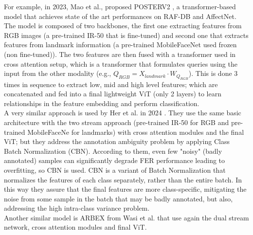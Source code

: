 For example, in 2023, Mao et al., proposed POSTERV2 \cite{RW_1_POSTERV2}, a transformer-based model that achieves state of the art performances on RAF-DB and AffectNet. The model is composed of two backbones, the first one extracting features from RGB images (a pre-trained IR-50 \cite{IR-50} that is fine-tuned) and second one that extracts features from landmark information (a pre-trained MobileFaceNet \cite{MobileFaceNet} used frozen (non fine-tuned)). The two features are then fused with a transformer used in cross attention setup, which is a transformer that formulates queries using the input from the other modality (e.g., $Q_{RGB}= X_{landmark} \cdot W_{Q_{RGB}} $). This is done 3 times in sequence to extract low, mid and high level features; which are concatenated and fed into a final lightweight ViT \cite{Vision_Transformer} (only 2 layers) to learn relationships in the feature embedding and perform classification.\\

A very similar approach is used by Her et al. in 2024 \cite{RW_13_BTN}. They use the same basic architecture with the two stream approach (pre-trained IR-50 for RGB  and pre-trained MobileFaceNe for landmarks) with cross attention modules and the final ViT; but they address the annotation ambiguity problem by applying Class Batch Normalization (CBN). According to them, even few "noisy" (badly annotated) samples can significantly degrade FER performance \cite{RW_13_BTN} leading to overfitting, so CBN is used. CBN is a variant of Batch Normalization that normalizes the features of each class separately, rather than the entire batch. In this way they assure that the final features are more class-specific, mitigating the noise from some sample in the batch that may be badly annotated, but also, addressing the high intra-class variance problem.\\

Another similar model is ARBEX \cite{RW_5_ARBEX} from Wasi et al. that use again the dual stream network, cross attention modules and final ViT.\\

